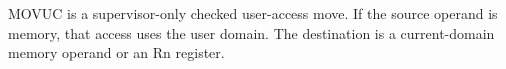 MOVUC is a supervisor-only checked user-access move. If the source operand is memory, that access uses the user domain. The destination is a current-domain memory operand or an Rn register.
